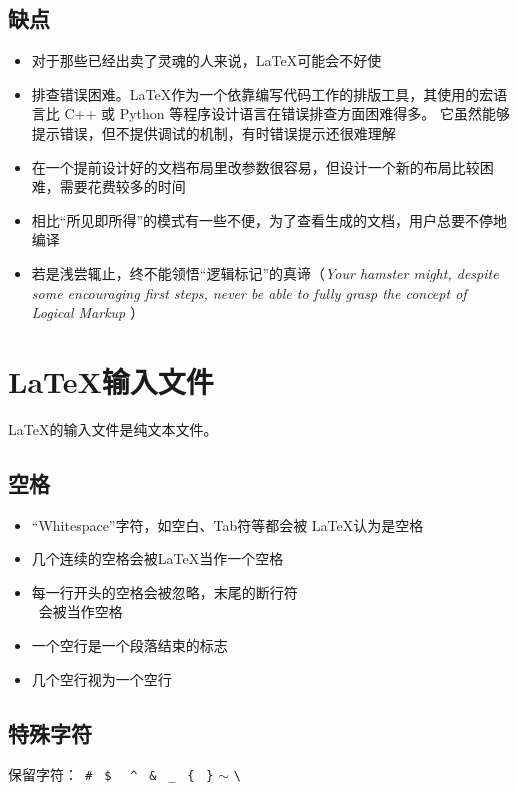 \documentclass[UTF8]{ctexart}
\begin{document}
\subsection{缺点}
\begin{itemize}
    \item 对于那些已经出卖了灵魂的人来说，LaTeX可能会不好使
    \item 排查错误困难。\LaTeX 作为一个依靠编写代码工作的排版工具，其使用的宏语言比 C++ 或 Python 等程序设计语言在错误排查方面困难得多。
        它虽然能够提示错误，但不提供调试的机制，有时错误提示还很难理解
    \item 在一个提前设计好的文档布局里改参数很容易，但设计一个新的布局比较困难，需要花费较多的时间
    \item 相比“所见即所得”的模式有一些不便，为了查看生成的文档，用户总要不停地编译
    \item 若是浅尝辄止，终不能领悟“逻辑标记”的真谛（{\itshape Your hamster might, despite some encouraging first steps,
        never be able to fully grasp the concept of Logical Markup} ）
\end{itemize}

\section{\LaTeX 输入文件}
\LaTeX 的输入文件是纯文本文件。
\subsection{空格}
\begin{itemize}
    \item “Whitespace”字符，如空白、Tab符等都会被 \LaTeX 认为是空格
    \item 几个连续的空格会被\LaTeX 当作一个空格
    \item 每一行开头的空格会被忽略，末尾的断行符~\texttt{\\}~会被当作空格
    \item 一个空行是一个段落结束的标志
    \item 几个空行视为一个空行
\end{itemize}
\subsection{特殊字符}
保留字符：\qquad \texttt{~\#} \qquad \texttt{~\$} \qquad \texttt{~~\^} \qquad \texttt{~\&} \qquad \texttt{~\_} \qquad
\texttt{~\{} \qquad \texttt{~\}} \qquad \texttt{$\sim$} \qquad \texttt{\textbackslash}
\end{document}
